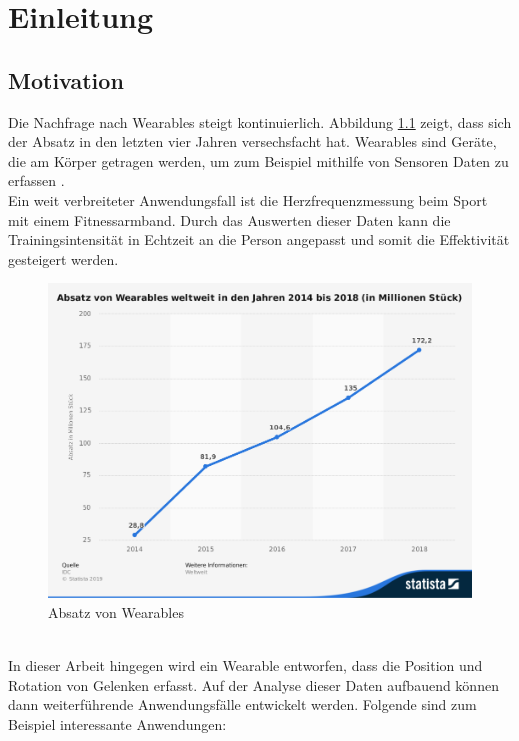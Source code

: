 \chapter{Einleitung}

\section{Motivation}
Die Nachfrage nach Wearables steigt kontinuierlich.
Abbildung \ref{fig:stat_wearables} zeigt, dass sich der Absatz in den letzten vier Jahren versechsfacht hat.
Wearables sind Geräte, die am Körper getragen werden, um zum Beispiel mithilfe von Sensoren Daten zu erfassen \cite{definition_wearables}.\\
Ein weit verbreiteter Anwendungsfall ist die Herzfrequenzmessung beim Sport mit einem Fitnessarmband.
Durch das Auswerten dieser Daten kann die Trainingsintensität in Echtzeit an die Person angepasst und somit die Effektivität gesteigert werden.
\begin{figure}[h]
	\centering
	\includegraphics[width=0.75\linewidth]{res/01_statistic_id515723_absatz-von-wearables-weltweit-bis-2018.png}
	\caption{Absatz von Wearables \cite{statistik_wearables}}
	\label{fig:stat_wearables}
\end{figure}\\
In dieser Arbeit hingegen wird ein Wearable entworfen, dass die Position und Rotation von Gelenken erfasst.
Auf der Analyse dieser Daten aufbauend können dann weiterführende Anwendungsfälle entwickelt werden.
Folgende sind zum Beispiel interessante Anwendungen:
